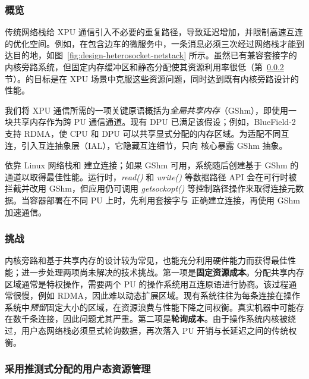 \subsubsection{概览}

传统网络栈给 XPU 通信引入不必要的重复路径，导致延迟增加，并限制高速互连的优化空间。例如，在包含边车的微服务中，一条消息必须三次经过网络栈才能到达目的地，如图~\ref{fig:design-heterosocket-netstack} 所示。虽然已有兼容套接字的内核旁路系统\cite{f-stack,dpdk,libvma}，但固定内存缓冲区和静态分配使其资源利用率很低（第~\ref{subsubs:hetero-socket-challenges} 节）。\gsocket 的目标是在 XPU 场景中克服这些资源问题，同时达到既有内核旁路设计的性能。

我们将 XPU 通信所需的一项关键原语概括为\emph{全局共享内存}（GShm），即使用一块共享内存作为跨 PU 通信通道。现有 DPU 已满足该假设\cite{mellanoxbf,marvel-liquidio}；例如，BlueField-2 支持 RDMA，使 CPU 和 DPU 可以共享显式分配的内存区域。为适配不同互连，\gsocket 引入互连抽象层（IAL），它隐藏互连细节，只向 \gsocket 核心暴露 GShm 抽象。

\gsocket 依靠 Linux 网络栈和 \giptable 建立连接；如果 GShm 可用，系统随后创建基于 GShm 的通道以取得最佳性能。运行时，\emph{read()} 和 \emph{write()} 等数据路径 API 会在可行时被拦截并改用 GShm，但应用仍可调用 \emph{getsockopt()} 等控制路径操作来取得连接元数据。当容器部署在不同 PU 上时，\gsocket 先利用套接字与 \giptable 正确建立连接，再使用 GShm 加速通信。

\subsubsection{挑战}
\label{subsubs:hetero-socket-challenges}

内核旁路和基于共享内存的设计较为常见，也能充分利用硬件能力而获得最佳性能；\gsocket 进一步处理两项尚未解决的技术挑战。第一项是\textbf{固定资源成本}。分配共享内存区域通常是特权操作，需要两个 PU 的操作系统用互连原语进行协商。该过程通常很慢，例如 RDMA\cite{280746}，因此难以动态扩展区域。现有系统往往为每条连接在操作系统中\emph{预留}固定大小的区域，在资源浪费与性能下降之间权衡。真实机器中可能存在数千条连接，因此问题尤其严重。第二项是\textbf{轮询成本}。由于操作系统内核被绕过，用户态网络栈必须显式轮询数据，再次落入 PU 开销与长延迟之间的传统权衡。

\subsubsection{采用推测式分配的用户态资源管理}
\label{ss:spec-alloc}

